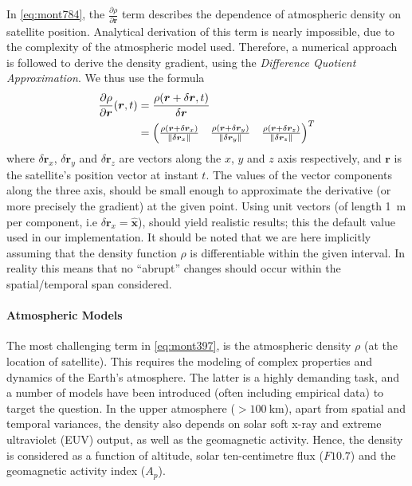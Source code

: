 In \autoref{eq:mont784}, the $\frac{\partial \rho}{\partial \bm{r}}$ term describes 
the dependence of atmospheric density on satellite position. Analytical derivation 
of this term is nearly impossible, due to the complexity of the atmospheric model 
used. Therefore, a numerical approach is followed to derive the density gradient, 
using the \emph{Difference Quotient Approximation}. We thus use the formula
\begin{equation}
  \begin{aligned}
  \frac{\partial \rho}{\partial \bm{r}}(\bm{r},t) 
    &= 
      \frac{\rho (\bm{r}+\delta \bm{r}, t)}{\delta \bm{r}} \\
    &= \begin{pmatrix}
      \frac{\rho (\bm{r}+\delta \bm{r}_x)}{\lVert\delta \bm{r}_x\rVert} &
      \frac{\rho (\bm{r}+\delta \bm{r}_y)}{\lVert\delta \bm{r}_y\rVert} &
      \frac{\rho (\bm{r}+\delta \bm{r}_z)}{\lVert\delta \bm{r}_z\rVert} 
    \end{pmatrix}^T
  \end{aligned}
\end{equation}
where $\delta \bm{r}_x$, $\delta \bm{r}_y$ and $\delta \bm{r}_z$ are vectors along 
the $x$, $y$ and $z$ axis respectively, and $\bm{r}$ is the satellite's position 
vector at instant $t$. The values of the vector components along the three axis, 
should be small enough to approximate the derivative (or more precisely the gradient) 
at the given point. Using unit vectors (of length \SI{1}{\meter} per component, i.e 
$\delta \bm{r}_x = \hat{\bm{x}}$), should yield realistic results; this the 
default value used in our implementation. It should be noted that we are here 
implicitly assuming that the density function $\rho$ is differentiable within the 
given interval. In reality this means that no ``abrupt'' changes should occur within 
the spatial/temporal span considered.

\paragraph{Atmospheric Models}\label{par:atmospheric-models}
The most challenging term in \autoref{eq:mont397}, is the atmospheric density $\rho$ 
(at the location of satellite). This requires the modeling of complex properties 
and dynamics of the Earth's atmosphere. The latter is a highly demanding task, and 
a number of models have been introduced (often including empirical data) to 
target the question. In the upper atmosphere ($>\SI{100}{\km}$), apart from spatial 
and temporal variances, the density also depends on solar soft x-ray and extreme 
ultraviolet (EUV) output, as well as the geomagnetic activity. Hence, the density is 
considered as a function of altitude, solar ten-centimetre flux ($F10.7$) and the 
geomagnetic activity index ($A_p$). 

